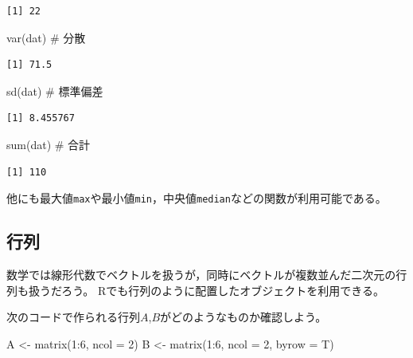 \documentclass[
  a4paper,
]{ltjsbook}
\newenvironment{Shaded}{\begin{snugshade}}{\end{snugshade}}
\newcommand{\AttributeTok}[1]{\textcolor[rgb]{0.40,0.45,0.13}{#1}}
\newcommand{\CommentTok}[1]{\textcolor[rgb]{0.37,0.37,0.37}{#1}}
\newcommand{\DecValTok}[1]{\textcolor[rgb]{0.68,0.00,0.00}{#1}}
\newcommand{\FunctionTok}[1]{\textcolor[rgb]{0.28,0.35,0.67}{#1}}
\newcommand{\NormalTok}[1]{\textcolor[rgb]{0.00,0.23,0.31}{#1}}
\newcommand{\OtherTok}[1]{\textcolor[rgb]{0.00,0.23,0.31}{#1}}
\newcommand{\SpecialCharTok}[1]{\textcolor[rgb]{0.37,0.37,0.37}{#1}}
\begin{document}
\begin{verbatim}
[1] 22
\end{verbatim}

\begin{Shaded}
\begin{Highlighting}[]
\FunctionTok{var}\NormalTok{(dat)  }\CommentTok{\# 分散}
\end{Highlighting}
\end{Shaded}

\begin{verbatim}
[1] 71.5
\end{verbatim}

\begin{Shaded}
\begin{Highlighting}[]
\FunctionTok{sd}\NormalTok{(dat)   }\CommentTok{\# 標準偏差}
\end{Highlighting}
\end{Shaded}

\begin{verbatim}
[1] 8.455767
\end{verbatim}

\begin{Shaded}
\begin{Highlighting}[]
\FunctionTok{sum}\NormalTok{(dat)  }\CommentTok{\# 合計}
\end{Highlighting}
\end{Shaded}

\begin{verbatim}
[1] 110
\end{verbatim}

他にも最大値\texttt{max}や最小値\texttt{min}，中央値\texttt{median}などの関数が利用可能である。

\subsection{行列}\label{ux884cux5217}

数学では線形代数でベクトルを扱うが，同時にベクトルが複数並んだ二次元の行列も扱うだろう。
Rでも行列のように配置したオブジェクトを利用できる。

次のコードで作られる行列\(A\),\(B\)がどのようなものか確認しよう。

\begin{Shaded}
\begin{Highlighting}[]
\NormalTok{A }\OtherTok{\textless{}{-}} \FunctionTok{matrix}\NormalTok{(}\DecValTok{1}\SpecialCharTok{:}\DecValTok{6}\NormalTok{, }\AttributeTok{ncol =} \DecValTok{2}\NormalTok{)}
\NormalTok{B }\OtherTok{\textless{}{-}} \FunctionTok{matrix}\NormalTok{(}\DecValTok{1}\SpecialCharTok{:}\DecValTok{6}\NormalTok{, }\AttributeTok{ncol =} \DecValTok{2}\NormalTok{, }\AttributeTok{byrow =}\NormalTok{ T)}
\end{Highlighting}
\end{Shaded}
\end{document}
